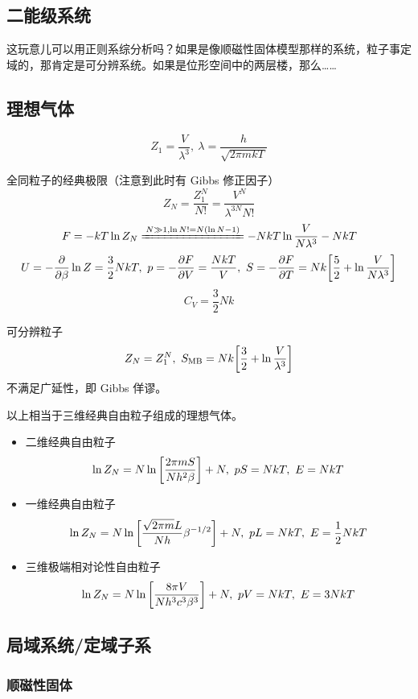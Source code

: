 \subsection{二能级系统}

这玩意儿可以用正则系综分析吗？如果是像顺磁性固体模型那样的系统，粒子事定域的，那肯定是可分辨系统。如果是位形空间中的两层楼，那么……

\subsection{理想气体}

\[
    Z_1 = \frac{V}{\lambda^3},\ \lambda = \frac{h}{\sqrt{2 \pi m k T}}
\]

全同粒子的经典极限（注意到此时有 Gibbs 修正因子） \[
    Z_N = \frac{Z_1^N}{N!} = \frac{V^N}{\lambda^{3 N} N!}
\] \[
    F = - k T \ln{Z_N} \xlongequal{N \gg 1, \ln{N!} = N (\ln{N} - 1)} - N k T \ln{\frac{V}{N \lambda^3}} - N k T
\] \[
    U = - \pdv{\beta} \ln{Z} = \frac{3}{2} N k T,\ p = - \pdv{F}{V} = \frac{N k T}{V},\ S = - \pdv{F}{T} = N k \qty[\frac{5}{2} + \ln{\frac{V}{N \lambda^3}}]
\] \[
    C_V = \frac{3}{2} N k
\]

可分辨粒子 \[
    Z_N = Z_1^N,\ S_{\text{MB}} = N k \qty[\frac{3}{2} + \ln{\frac{V}{\lambda^3}}]
\] 不满足广延性，即 Gibbs 佯谬。

\begin{framed}
    以上相当于三维经典自由粒子组成的理想气体。
    \begin{itemize}
        \item 二维经典自由粒子 \[
                  \ln{Z_N} = N \ln \qty[\frac{2 \pi m S}{N h^2 \beta}] + N,\ p S = N k T,\ E = N k T
              \]
        \item 一维经典自由粒子 \[
                  \ln{Z_N} = N \ln \qty[\frac{\sqrt{2 \pi m} L}{N h} \beta^{- 1 / 2}] + N,\ p L = N k T,\ E = \frac{1}{2} N k T
              \]
        \item 三维极端相对论性自由粒子 \[
                  \ln{Z_N} = N \ln \qty[\frac{8 \pi V}{N h^3 c^3 \beta^3}] + N,\ p V = N k T,\ E = 3 N k T
              \]
    \end{itemize}
\end{framed}

\subsection{局域系统/定域子系}

\subsubsection{顺磁性固体}

